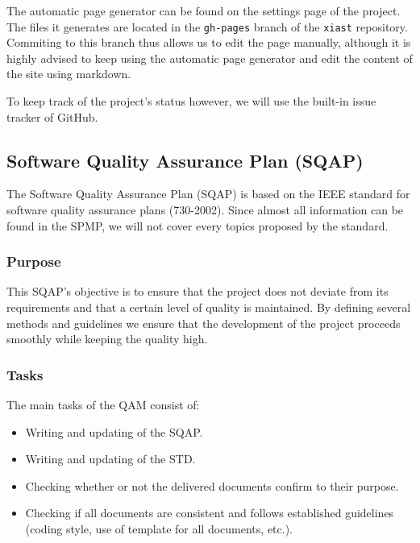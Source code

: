 \documentclass[12pt]{article}
\begin{document}
The automatic page generator can be found on the settings page of the
project. The files it generates are located in the \texttt{gh-pages}
branch of the \texttt{xiast} repository. Commiting to this branch thus
allows us to edit the page manually, although it is highly advised to
keep using the automatic page generator and edit the content of the site
using markdown.

To keep track of the project's status however, we will use the built-in
issue tracker of GitHub.

\subsection{Software Quality Assurance Plan
(SQAP)}\label{software-quality-assurance-plan-sqap}

The Software Quality Assurance Plan (SQAP) is based on the IEEE standard
for software quality assurance plans (730-2002). Since almost all
information can be found in the SPMP, we will not cover every topics
proposed by the standard.

\subsubsection{Purpose}\label{purpose}

This SQAP's objective is to ensure that the project does not deviate
from its requirements and that a certain level of quality is maintained.
By defining several methods and guidelines we ensure that the
development of the project proceeds smoothly while keeping the quality
high.

\subsubsection{Tasks}\label{tasks}

The main tasks of the QAM consist of:

\begin{itemize}
\itemsep1pt\parskip0pt
\item
  Writing and updating of the SQAP.
\item
  Writing and updating of the STD.
\item
  Checking whether or not the delivered documents confirm to their
  purpose.
\item
  Checking if all documents are consistent and follows established
  guidelines (coding style, use of template for all documents, etc.).
\end{itemize}
\end{document}
